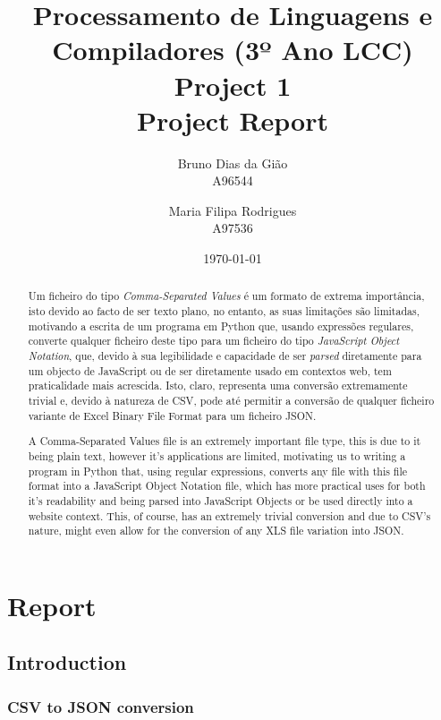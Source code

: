 \documentclass[11pt,a4paper,times]{report}
\title{Processamento de Linguagens e Compiladores (3º Ano LCC)\\ 
      \textbf{Project 1} \\ Project Report
      }
\date{\today}
\author{Bruno Dias da Gião\\ A96544 \and Maria Filipa Rodrigues \\ A97536}
\def\CSV{Comma-Separated Values\xspace}
\def\JSON{JavaScript Object Notation\xspace}
\def\XLS{Excel Binary File Format\xspace}
\begin{document}
\maketitle

\begin{abstract}
Um ficheiro do tipo \textit{\CSV} é um formato de extrema importância, isto devido ao facto de ser texto plano,
no entanto, as suas limitações são limitadas, motivando a escrita de um programa em Python que, usando expressões
regulares, converte qualquer ficheiro deste tipo para um ficheiro do tipo \textit{\JSON}, que, devido à sua
legibilidade e capacidade de ser \textit{parsed} diretamente para um objecto de JavaScript
ou de ser diretamente usado em contextos web, tem praticalidade mais acrescida.
Isto, claro, representa uma conversão extremamente trivial e, devido à natureza de CSV, pode até permitir a
conversão de qualquer ficheiro variante de \XLS para um ficheiro JSON.
\end{abstract}
\begin{abstract}
A \CSV file is an extremely important file type, this is due to it being plain text, however it's applications
are limited, motivating us to writing a program in Python that, using regular expressions, converts any file
with this file format into a \JSON file, which has more practical uses for both it's readability and being parsed
into JavaScript Objects or be used directly into a website context.
This, of course, has an extremely trivial conversion and due to CSV's nature, might even
allow for the conversion of any XLS file variation into JSON.
\end{abstract}

\tableofcontents

\chapter{Report} \label{chap:report}
\section{Introduction} \label{intro} 
\subsection{CSV to JSON conversion}
\end{document}
